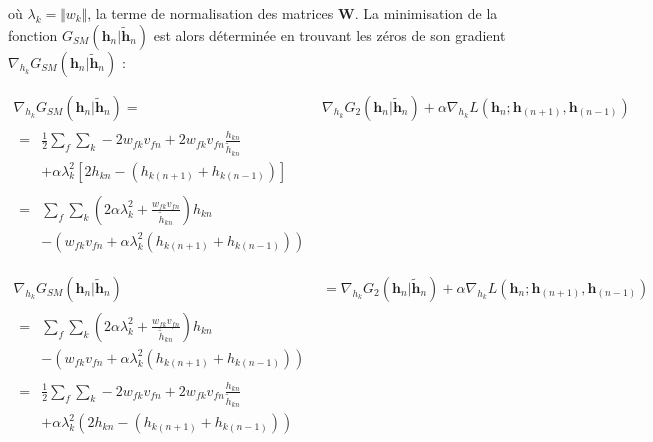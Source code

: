 où $\lambda_k = \Vert w_k \Vert$, la terme de normalisation des matrices $\mathbf{W}$. La minimisation de la fonction $G_{SM}(\mathbf{h}_{n}\vert \mathbf{\tilde{h}}_{n})$ est alors déterminée en trouvant les zéros de son gradient $\nabla_{h_k} G_{SM}(\mathbf{h}_{n}\vert \mathbf{\tilde{h}}_{n})$ :


\begin{align}
\nabla_{h_{k}} G_{SM}(\mathbf{h}_{n}\vert \mathbf{\tilde{h}}_{n}) ={}& \nabla_{h_{k}} G_{2}(\mathbf{h}_{n}\vert \mathbf{\tilde{h}}_{n}) + \alpha \nabla_{h_{k}} L(\mathbf{h}_{n}; \mathbf{h}_{(n+1)}, \mathbf{h}_{(n-1)})\\
\begin{split}
 ={}& \frac{1}{2}\sum_{f} \sum_{k} -2 w_{fk} v_{fn} + 2 w_{fk} v_{fn} \frac{h_{kn}}{\tilde{h}_{kn}} \\
 & + \alpha \lambda_k^2 \left[ 2 h_{kn}- (h_{k(n+1)}+h_{k(n-1)}) \right]
 \end{split}\\
\begin{split}
 ={}& \sum_{f} \sum_{k} \left( 2\alpha \lambda_k^2 + \frac{w_{fk} v_{fn}} {\tilde{h}_{kn}}\right)h_{kn} \\
 & - \left(w_{fk} v_{fn} + \alpha  \lambda_k^2 \left(h_{k(n+1)}+h_{k(n-1)}\right)\right) 
\end{split}\label{eq:smooth_1}
\end{align}

\begin{align}
\nabla_{h_{k}} G_{SM}(\mathbf{h}_{n}\vert \mathbf{\tilde{h}}_{n}) &= \nabla_{h_{k}} G_{2}(\mathbf{h}_{n}\vert \mathbf{\tilde{h}}_{n}) + \alpha \nabla_{h_{k}} L(\mathbf{h}_{n}; \mathbf{h}_{(n+1)}, \mathbf{h}_{(n-1)})\\
\begin{split}
    ={}& \sum_{f} \sum_{k} \left( 2\alpha \lambda_k^2 + \frac{w_{fk} v_{fn}}{\tilde{h}_{kn}}\right)h_{kn} \\
    & - \left(w_{fk} v_{fn} + \alpha \lambda_k^2 \left(h_{k(n+1)}+h_{k(n-1)}\right)\right) 
    \end{split}\label{eq:smooth_2}\\
\begin{split}
    ={}& \frac{1}{2}\sum_{f} \sum_{k} -2 w_{fk} v_{fn} + 2 w_{fk} v_{fn} \frac{h_{kn}}{\tilde{h}_{kn}} \\
    & + \alpha \lambda_k^2 \left( 2 h_{kn}- (h_{k(n+1)}+h_{k(n-1)}) \right)
\end{split}
\end{align}



